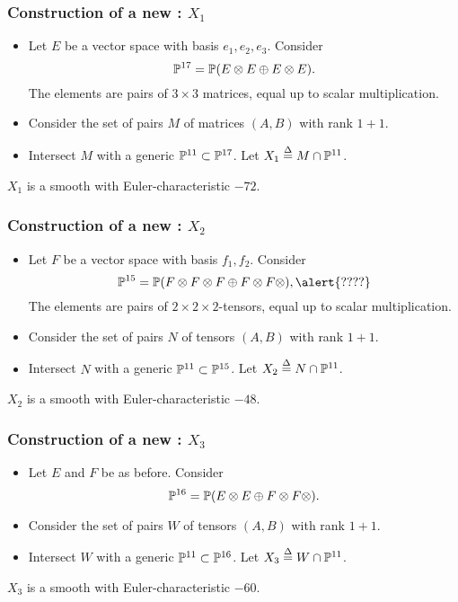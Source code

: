 \begin{frame}
\frametitle{Construction of a new \CY: $X_1$}

\begin{itemize}
	\item Let $E$ be a vector space with basis $e_1,e_2,e_3$. Consider
	$$
	\P^{17} = \P(E \otimes E \oplus E \otimes E).
	$$
	The elements are pairs of $3 \times 3$ matrices, equal up to scalar multiplication.
	\item Consider the set of pairs $M$ of matrices $(A,B)$ with rank $1+1$. 
	\item Intersect $M$ with a generic $\P^{11} \subset \P^{17}$. Let $X_1 \stackrel \Delta = M \cap \P^{11}$.
\end{itemize}

\begin{theorem}
$X_1$ is a smooth \CY with Euler-characteristic $-72$.
\end{theorem}

\end{frame}


\begin{frame}
\frametitle{Construction of a new \CY: $X_2$}

\begin{itemize}
	\item Let $F$ be a vector space with basis $f_1,f_2$. Consider
	\[
        \P^{15} = \P(F \otimes F \otimes F \oplus F \otimes F \otimes),
        \alert{????}
	\]
	The elements are pairs of $2 \times 2 \times 2$-tensors, equal up to scalar multiplication.
	\item Consider the set of pairs $N$ of tensors $(A,B)$ with rank $1+1$.
	\item Intersect $N$ with a generic $\P^{11} \subset \P^{15}$. Let $X_2 \stackrel \Delta = N \cap \P^{11}$.
\end{itemize}

\begin{theorem}
$X_2$ is a smooth \CY with Euler-characteristic $-48$.
\end{theorem}

\end{frame}

\begin{frame}
\frametitle{Construction of a new \CY: $X_3$}

\begin{itemize}
	\item Let $E$ and $F$ be as before. Consider
	$$
\P^{16} = \P(E \otimes E \oplus F \otimes F \otimes).
	$$
	\item Consider the set of pairs $W$ of tensors $(A,B)$ with rank $1+1$.
	\item Intersect $W$ with a generic $\P^{11} \subset \P^{16}$. Let $X_3 \stackrel \Delta =  W \cap \P^{11}$.
\end{itemize}

\begin{theorem}
$X_3$ is a smooth \CY with Euler-characteristic $-60$.
\end{theorem}

\end{frame}

